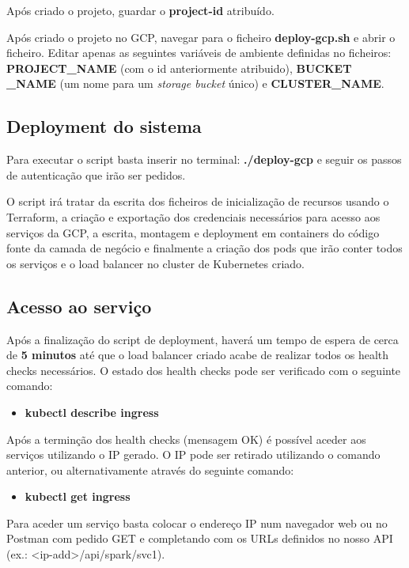 \documentclass[11pt,a4paper]{article}
\begin{document}
Após criado o projeto, guardar o \textbf{project-id} atribuído.

Após criado o projeto no GCP, navegar para o ficheiro \textbf{deploy-gcp.sh} e abrir o ficheiro. Editar apenas as seguintes variáveis de ambiente definidas no ficheiros: \textbf{PROJECT\_NAME} (com o id anteriormente atribuido), \textbf{BUCKET \_NAME} (um nome para um \textit{storage bucket} único) e \textbf{CLUSTER\_NAME}.

\subsection{Deployment do sistema}
Para executar o script basta inserir no terminal: \textbf{./deploy-gcp} e seguir os passos de autenticação que irão ser pedidos.

O script irá tratar da escrita dos ficheiros de inicialização de recursos usando o Terraform, a criação e exportação dos credenciais necessários para acesso aos serviços da GCP, a escrita, montagem e deployment em containers do código fonte da camada de negócio e finalmente a criação dos pods que irão conter todos os serviços e o load balancer no cluster de Kubernetes criado.

\subsection{Acesso ao serviço}
Após a finalização do script de deployment, haverá um tempo de espera de cerca de \textbf{5 minutos} até que o load balancer criado acabe de realizar todos os health checks necessários. O estado dos health checks pode ser verificado com o seguinte comando:
\begin{itemize}
	\item \textbf{kubectl describe ingress}
\end{itemize}

Após a terminção dos health checks (mensagem OK) é possível aceder aos serviços utilizando o IP gerado. O IP pode ser retirado utilizando o comando anterior, ou alternativamente através do seguinte comando:
\begin{itemize}
	\item \textbf{kubectl get ingress}
\end{itemize}

Para aceder um serviço basta colocar o endereço IP num navegador web ou no Postman com pedido GET e completando com os URLs definidos no nosso API (ex.: <ip-add>/api/spark/svc1).
\end{document}
